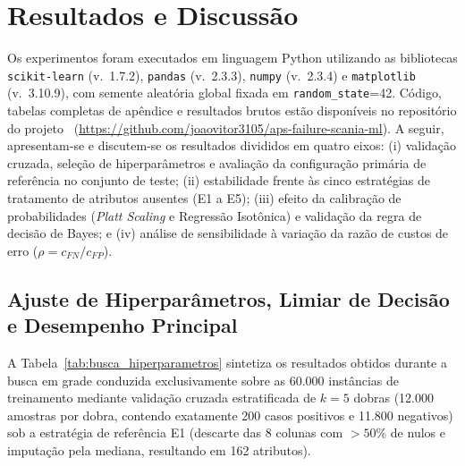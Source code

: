 \documentclass[conference]{IEEEtran}
\begin{document}
\section{Resultados e Discussão}
\label{sec:resultados}

Os experimentos foram executados em linguagem Python utilizando as bibliotecas \texttt{scikit-learn} (v.~1.7.2), \texttt{pandas} (v.~2.3.3), \texttt{numpy} (v.~2.3.4) e \texttt{matplotlib} (v.~3.10.9), com semente aleatória global fixada em \texttt{random\_state}=42. Código, tabelas completas de apêndice e resultados brutos estão disponíveis no repositório do projeto~\cite{romualdo2026repo} (\url{https://github.com/joaovitor3105/aps-failure-scania-ml}). A seguir, apresentam-se e discutem-se os resultados divididos em quatro eixos: (i) validação cruzada, seleção de hiperparâmetros e avaliação da configuração primária de referência no conjunto de teste; (ii) estabilidade frente às cinco estratégias de tratamento de atributos ausentes (E1 a E5); (iii) efeito da calibração de probabilidades (\textit{Platt Scaling} e Regressão Isotônica) e validação da regra de decisão de Bayes; e (iv) análise de sensibilidade à variação da razão de custos de erro ($\rho = c_{FN}/c_{FP}$).

\subsection{Ajuste de Hiperparâmetros, Limiar de Decisão e Desempenho Principal}

A Tabela~\ref{tab:busca_hiperparametros} sintetiza os resultados obtidos durante a busca em grade conduzida exclusivamente sobre as 60.000 instâncias de treinamento mediante validação cruzada estratificada de $k=5$ dobras (12.000 amostras por dobra, contendo exatamente 200 casos positivos e 11.800 negativos) sob a estratégia de referência E1 (descarte das 8 colunas com $>50\%$ de nulos e imputação pela mediana, resultando em 162 atributos).
\end{document}
